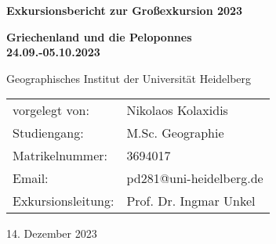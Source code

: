 \documentclass[preprint]{geomorphica} %
\begin{document}


\begin{titlepage}
\begin{center}

\vspace{-20mm}
\vspace*{20mm}

\begin{Huge}
\textbf{Exkursionsbericht zur Großexkursion 2023}
\end{Huge}

\vspace{25mm}

\begin{LARGE}
\textbf{Griechenland und die Peloponnes \\ 24.09.-05.10.2023} \\ [6pt]
\end{LARGE}

\vspace{50mm}

\begin{Large}
Geographisches Institut der Universität Heidelberg
\end{Large}

\vspace{50mm}

\begin{table}[ht]
    \begin{center}
        \begin{tabular}{l l} 
        vorgelegt von: & Nikolaos Kolaxidis \\ [6pt]
        Studiengang: & M.Sc. Geographie \\ [6pt]
        Matrikelnummer: & 3694017 \\ [6pt]
        Email: & pd281@uni-heidelberg.de \\ [6pt]
        Exkursionsleitung: & Prof. Dr. Ingmar Unkel \\
        \end{tabular}
    \end{center}
\end{table}

\vspace*{\fill}
14. Dezember 2023

\end{center}
\end{titlepage}

\end{document}
